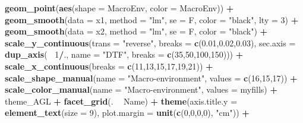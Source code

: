 \documentclass[
]{article}
\newenvironment{Shaded}{\begin{snugshade}}{\end{snugshade}}
\newcommand{\DataTypeTok}[1]{\textcolor[rgb]{0.13,0.29,0.53}{#1}}
\newcommand{\DecValTok}[1]{\textcolor[rgb]{0.00,0.00,0.81}{#1}}
\newcommand{\FloatTok}[1]{\textcolor[rgb]{0.00,0.00,0.81}{#1}}
\newcommand{\KeywordTok}[1]{\textcolor[rgb]{0.13,0.29,0.53}{\textbf{#1}}}
\newcommand{\NormalTok}[1]{#1}
\newcommand{\OperatorTok}[1]{\textcolor[rgb]{0.81,0.36,0.00}{\textbf{#1}}}
\newcommand{\StringTok}[1]{\textcolor[rgb]{0.31,0.60,0.02}{#1}}
\begin{document}
\begin{Shaded}
\begin{Highlighting}[]
{{{{{\StringTok{  }\KeywordTok{geom_point}\NormalTok{(}\KeywordTok{aes}\NormalTok{(}\DataTypeTok{shape =}\NormalTok{ MacroEnv, }\DataTypeTok{color =}\NormalTok{ MacroEnv)) }\OperatorTok{+}
\StringTok{  }\KeywordTok{geom_smooth}\NormalTok{(}\DataTypeTok{data =}\NormalTok{ x1, }\DataTypeTok{method =} \StringTok{"lm"}\NormalTok{, }\DataTypeTok{se =}\NormalTok{ F, }\DataTypeTok{color =} \StringTok{"black"}\NormalTok{, }\DataTypeTok{lty =} \DecValTok{3}\NormalTok{) }\OperatorTok{+}
\StringTok{  }\KeywordTok{geom_smooth}\NormalTok{(}\DataTypeTok{data =}\NormalTok{ x2, }\DataTypeTok{method =} \StringTok{"lm"}\NormalTok{, }\DataTypeTok{se =}\NormalTok{ F, }\DataTypeTok{color =} \StringTok{"black"}\NormalTok{) }\OperatorTok{+}
\StringTok{  }\KeywordTok{scale_y_continuous}\NormalTok{(}\DataTypeTok{trans =} \StringTok{"reverse"}\NormalTok{, }\DataTypeTok{breaks =} \KeywordTok{c}\NormalTok{(}\FloatTok{0.01}\NormalTok{,}\FloatTok{0.02}\NormalTok{,}\FloatTok{0.03}\NormalTok{),}
        \DataTypeTok{sec.axis =} \KeywordTok{dup_axis}\NormalTok{(}\OperatorTok{~}\StringTok{ }\DecValTok{1}\OperatorTok{/}\NormalTok{., }\DataTypeTok{name =} \StringTok{"DTF"}\NormalTok{, }\DataTypeTok{breaks =} \KeywordTok{c}\NormalTok{(}\DecValTok{35}\NormalTok{,}\DecValTok{50}\NormalTok{,}\DecValTok{100}\NormalTok{,}\DecValTok{150}\NormalTok{))) }\OperatorTok{+}
\StringTok{  }\KeywordTok{scale_x_continuous}\NormalTok{(}\DataTypeTok{breaks =} \KeywordTok{c}\NormalTok{(}\DecValTok{11}\NormalTok{,}\DecValTok{13}\NormalTok{,}\DecValTok{15}\NormalTok{,}\DecValTok{17}\NormalTok{,}\DecValTok{19}\NormalTok{,}\DecValTok{21}\NormalTok{)) }\OperatorTok{+}
\StringTok{  }\KeywordTok{scale_shape_manual}\NormalTok{(}\DataTypeTok{name =} \StringTok{"Macro-environment"}\NormalTok{, }\DataTypeTok{values =} \KeywordTok{c}\NormalTok{(}\DecValTok{16}\NormalTok{,}\DecValTok{15}\NormalTok{,}\DecValTok{17}\NormalTok{)) }\OperatorTok{+}
\StringTok{  }\KeywordTok{scale_color_manual}\NormalTok{(}\DataTypeTok{name =} \StringTok{"Macro-environment"}\NormalTok{, }\DataTypeTok{values =}\NormalTok{ myfills) }\OperatorTok{+}
\StringTok{  }\NormalTok{theme_AGL }\OperatorTok{+}\StringTok{ }\KeywordTok{facet_grid}\NormalTok{(. }\OperatorTok{~}\StringTok{ }\NormalTok{Name) }\OperatorTok{+}\StringTok{ }
\StringTok{  }\KeywordTok{theme}\NormalTok{(}\DataTypeTok{axis.title.y =} \KeywordTok{element_text}\NormalTok{(}\DataTypeTok{size =} \DecValTok{9}\NormalTok{),}
        \DataTypeTok{plot.margin =} \KeywordTok{unit}\NormalTok{(}\KeywordTok{c}\NormalTok{(}\DecValTok{0}\NormalTok{,}\DecValTok{0}\NormalTok{,}\DecValTok{0}\NormalTok{,}\DecValTok{0}\NormalTok{), }\StringTok{"cm"}\NormalTok{)) }\OperatorTok{+}
}}}}}
\end{Highlighting}
\end{Shaded}
\end{document}
